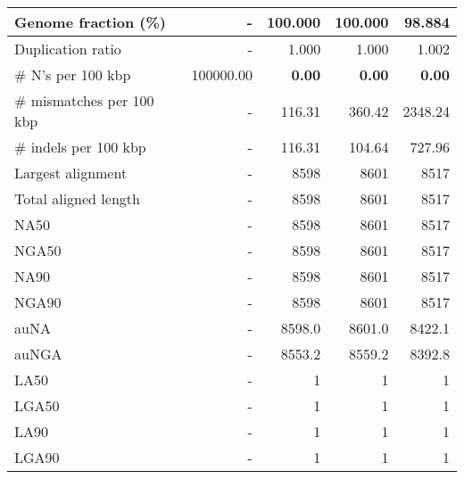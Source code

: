\documentclass[12pt,a4paper]{article}
\begin{document}
\begin{table}[ht]
\begin{center}
\begin{tabular}{|l*{4}{|r}|}
Genome fraction (\%) & - & 100.000 & 100.000 & 98.884 \\ \hline
Duplication ratio & - & 1.000 & 1.000 & 1.002 \\ \hline
\# N's per 100 kbp & 100000.00 & {\bf 0.00} & {\bf 0.00} & {\bf 0.00} \\ \hline
\# mismatches per 100 kbp & - & 116.31 & 360.42 & 2348.24 \\ \hline
\# indels per 100 kbp & - & 116.31 & 104.64 & 727.96 \\ \hline
Largest alignment & - & 8598 & 8601 & 8517 \\ \hline
Total aligned length & - & 8598 & 8601 & 8517 \\ \hline
NA50 & - & 8598 & 8601 & 8517 \\ \hline
NGA50 & - & 8598 & 8601 & 8517 \\ \hline
NA90 & - & 8598 & 8601 & 8517 \\ \hline
NGA90 & - & 8598 & 8601 & 8517 \\ \hline
auNA & - & 8598.0 & 8601.0 & 8422.1 \\ \hline
auNGA & - & 8553.2 & 8559.2 & 8392.8 \\ \hline
LA50 & - & 1 & 1 & 1 \\ \hline
LGA50 & - & 1 & 1 & 1 \\ \hline
LA90 & - & 1 & 1 & 1 \\ \hline
LGA90 & - & 1 & 1 & 1 \\ \hline
\end{tabular}
\end{center}
\end{table}
\end{document}
